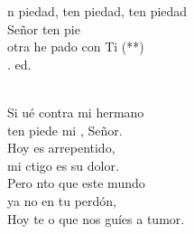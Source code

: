 \documentclass[12pt]{article}
\begin{document}
\begin{multicols*}{2}
\begin{cancion}%
	\begin{chorus}%
	n piedad, ten piedad, ten piedad\\
	Señor ten pie\\
	otra  he pado con Ti (**)\\
	. ed.\\
	\end{chorus}%
	\jump\\
	Si ué contra mi hermano \\
	ten piede mi , Señor.\\
	Hoy es arrepentido, \\
	mi ctigo es su dolor.\\
	Pero nto que este mundo \\
	ya no  en tu perdón,\\
	Hoy te o que nos guíes a tumor.\\
\end{cancion}%


\end{multicols*}
\end{document}
